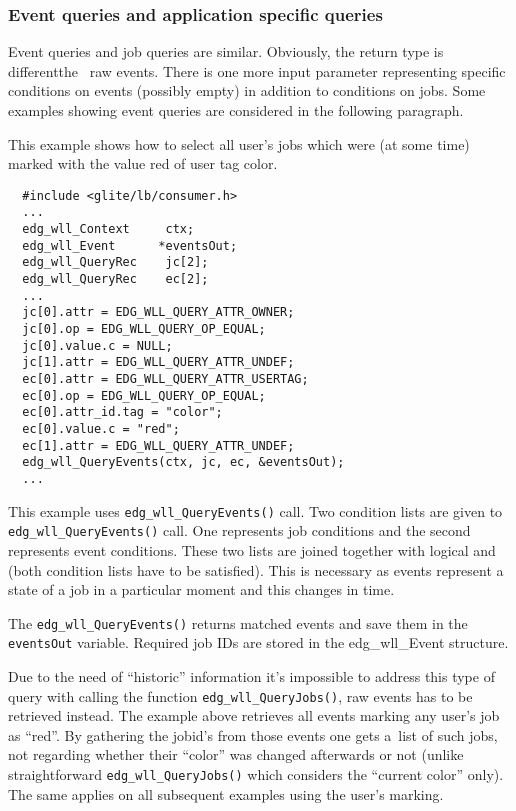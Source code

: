 
\subsubsection{Event queries and application specific queries}
\label{ASQ}
Event queries and job queries are similar. 
Obviously, the return type is different\Dash the \LB\ raw events.
There is one more input parameter
representing specific conditions on events (possibly empty)
in addition to conditions on jobs.
Some examples showing event queries 
are considered in the following paragraph.


\label{ASQ_allred}
This example shows how to select all user's jobs which were (at some time)
marked with the value red of user tag color.
\begin{verbatim}
  #include <glite/lb/consumer.h>
  ...
  edg_wll_Context     ctx;    
  edg_wll_Event      *eventsOut;
  edg_wll_QueryRec    jc[2];
  edg_wll_QueryRec    ec[2];
  ...
  jc[0].attr = EDG_WLL_QUERY_ATTR_OWNER;
  jc[0].op = EDG_WLL_QUERY_OP_EQUAL;
  jc[0].value.c = NULL;
  jc[1].attr = EDG_WLL_QUERY_ATTR_UNDEF;
  ec[0].attr = EDG_WLL_QUERY_ATTR_USERTAG;
  ec[0].op = EDG_WLL_QUERY_OP_EQUAL;
  ec[0].attr_id.tag = "color";
  ec[0].value.c = "red";
  ec[1].attr = EDG_WLL_QUERY_ATTR_UNDEF;
  edg_wll_QueryEvents(ctx, jc, ec, &eventsOut);
  ...
\end{verbatim}

This example uses \texttt{edg\_wll\_QueryEvents()} call. Two condition lists are
given to \texttt{edg\_wll\_QueryEvents()} call. One represents job conditions and
the second represents event conditions. These two lists are joined together with
logical and (both condition lists have to be satisfied). This is necessary as
events represent a state of a job in a particular moment and this changes in time.

The \texttt{edg\_wll\_QueryEvents()} returns matched events and save them in the
\texttt{eventsOut} variable. Required job IDs are stored in the edg\_wll\_Event
structure. 

Due to the need of ``historic'' information it's impossible to address
this type of query with calling the function \texttt{edg\_wll\_QueryJobs()}, raw events has to
be retrieved instead. The example above retrieves all events marking
any user's job as ``red''. By gathering the jobid's from those events one
gets a~list of such jobs, not regarding whether their ``color'' was
changed afterwards or not (unlike straightforward \texttt{edg\_wll\_QueryJobs()}
which considers the ``current color'' only). The same applies on all
subsequent examples using the user's marking.

